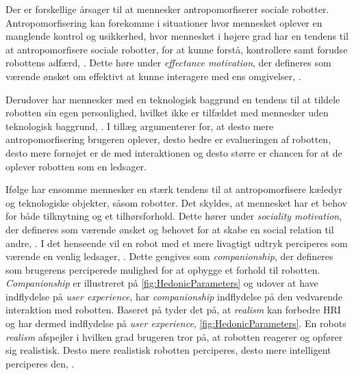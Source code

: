 Der er forskellige årsager til at mennesker antropomorfiserer sociale robotter. Antropomorfisering kan forekomme i situationer hvor mennesket oplever en manglende kontrol og usikkerhed, hvor mennesket i højere grad har en tendens til at antropomorfisere sociale robotter, for at kunne forstå, kontrollere samt forudse robottens adfærd, \parencite[s. 1478]{PDF:ExploringInfluencingVariable}. Dette høre under \textit{effectance motivation}, der defineres som værende ønsket om effektivt at kunne interagere med ens omgivelser, \parencite[s. 62]{PDF:EffectsOfAnticipatedHRI}.

Derudover har mennesker med en teknologisk baggrund en tendens til at tildele robotten sin egen personlighed, hvilket ikke er tilfældet med mennesker uden teknologisk baggrund, \parencite[s. 19]{PDF:CloseButNotStuck}. I tillæg argumenterer \textcite[s. 2]{PDF:SharingALifeHarvey} for, at desto mere antropomorfisering brugeren oplever, desto bedre er evalueringen af robotten, desto mere fornøjet er de med interaktionen og desto større er chancen for at de oplever robotten som en ledsager.

Ifølge \textcite[s. 61]{PDF:EffectsOfAnticipatedHRI} har ensomme mennesker en stærk tendens til at antropomorfisere kæledyr og teknologiske objekter, såsom robotter. Det skyldes, at mennesket har et behov for både tilknytning og et tilhørsforhold. Dette hører under \textit{sociality motivation}, der defineres som værende ønsket og behovet for at skabe en social relation til andre, \parencite[s. 61]{PDF:EffectsOfAnticipatedHRI}. I det henseende vil en robot med et mere livagtigt udtryk perciperes som værende en venlig ledsager, \parencite[s. 1478]{PDF:ExploringInfluencingVariable}. Dette gengives som \textit{companionship}, der defineres som brugerens perciperede mulighed for at opbygge et forhold til robotten. \textit{Companionship} er illustreret på \autoref{fig:HedonicParameters} og udover at have indflydelse på \textit{user experience}, har \textit{companionship} indflydelse på den vedvarende interaktion med robotten. \blankline
%
Baseret på \textcite[s. 1478]{PDF:ExploringInfluencingVariable} tyder det på, at \textit{realism} kan forbedre HRI og har dermed indflydelse på \textit{user experience}, \autoref{fig:HedonicParameters}. En robots \textit{realism} afspejler i hvilken grad brugeren tror på, at robotten reagerer og opfører sig realistisk. Desto mere realistisk robotten perciperes, desto mere intelligent perciperes den, \parencite[s. 1478]{PDF:ExploringInfluencingVariable}. 

